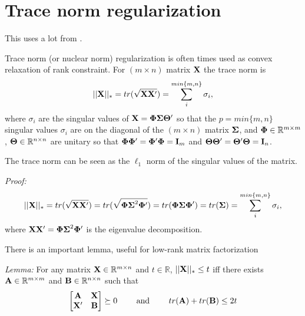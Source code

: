 
\clearpage

\section{Trace norm regularization}\label{sec:TraceNorm}

This uses a lot from \cite{Srebro2004}.

Trace norm (or nuclear norm) regularization is often times used as convex relaxation of rank constraint.
For $(m \times n)$ matrix $\mathbf{X}$ the trace norm is
\begin{equation}
 ||\mathbf{X}||_* = tr(\sqrt{\mathbf{XX'}}) = \sum_i^{min\{m,n\}} \sigma_i,
\end{equation}
where $\sigma_i$ are the singular values of $\mathbf{X} = \mathbf{\Phi \Sigma \Theta'}$ so that the $p = min\{m,n\}$ singular values $\sigma_i$ are on the diagonal of the $(m \times n)$ matrix $\mathbf{\Sigma}$,
and $\mathbf{\Phi} \in \mathbb{R}^{m \times m}$, $\mathbf{\Theta}  \in \mathbb{R}^{n \times n}$ are unitary so that $\mathbf{\Phi \Phi'} = \mathbf{\Phi' \Phi}= \mathbf{I}_m$ and $\mathbf{\Theta \Theta'} = \mathbf{\Theta' \Theta} = \mathbf{I}_n$.

The trace norm can be seen as the $\ell_1$ norm of the singular values of the matrix.

\begin{small}
\emph{Proof:}
\begin{eqnarray*}
 ||\mathbf{X}||_* = tr(\sqrt{\mathbf{XX'}}) = tr(\sqrt{\mathbf{\Phi \Sigma}^2\mathbf{\Phi'}}) = tr(\mathbf{\Phi \Sigma \Phi'}) = tr(\mathbf{\Sigma}) = \sum_i^{min\{m,n\}} \sigma_i, 
\end{eqnarray*}
where $\mathbf{XX'} = \mathbf{\Phi \Sigma}^2\mathbf{\Phi'}$ is the eigenvalue decomposition.
\end{small}

There is an important lemma, useful for low-rank matrix factorization

\emph{Lemma:} For any matrix $\mathbf{X} \in \mathbb{R}^{m \times n}$ and $t \in \mathbb{R}$, $||\mathbf{X}||_* \le t$
iff there exists $\mathbf{A} \in \mathbb{R}^{m \times m}$ and $\mathbf{B} \in \mathbb{R}^{n \times n}$ such that
\begin{equation*}
 \begin{bmatrix}
  \mathbf{A} & \mathbf{X} \\
  \mathbf{X'} & \mathbf{B} \\
 \end{bmatrix}
 \succeq 0 
\qquad \text{ and }
\qquad tr(\mathbf{A}) + tr(\mathbf{B}) \le 2t
\end{equation*}

